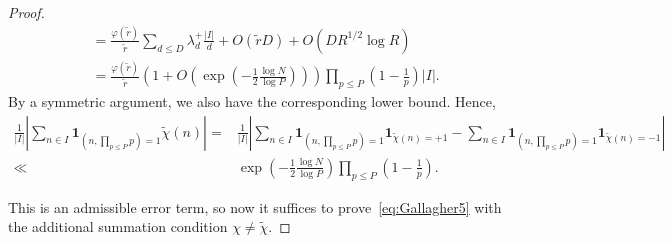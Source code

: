 \documentclass[12pt]{amsart}
\theoremstyle{definition}
\theoremstyle{remark}
\numberwithin{equation}{section}
\newcommand{\1}{\mathbf{1}}
\begin{document}
\begin{proof}
\begin{align*}
        &=\frac{\varphi(\widetilde{r})}{\widetilde{r}}\sum_{d\leq D}\lambda_d^{+}\frac{|I|}{d}+O(\widetilde{r}D)+O(D R^{1/2}\log R)\\
        &=\frac{\varphi(\widetilde{r})}{\widetilde{r}}\left(1+O\left(\exp\left(-\frac{1}{2}\frac{\log N}{\log P}\right)\right)\right)\prod_{p\leq P}\left(1-\frac{1}{p}\right)|I|.
    \end{align*}
    By a symmetric  argument, we also have the corresponding lower bound. Hence,  
    \begin{align*}
        \frac{1}{|I|}\left|\sum_{n\in I}\1_{(n,\prod_{p\leq P}p)=1}\widetilde{\chi}(n)\right|=& \frac{1}{|I|}\left|\sum_{n\in I}\1_{(n,\prod_{p\leq P}p)=1}\1_{\widetilde{\chi}(n)=+1}-\sum_{n\in I}\1_{(n,\prod_{p\leq P}p)=1}\1_{\widetilde{\chi}(n)=-1}\right|\\
        \ll &\exp\left(-\frac{1}{2}\frac{\log N}{\log P}\right)\prod_{p\leq P}\left(1-\frac{1}{p}\right).  
    \end{align*}

    
    
    This is an admissible error term, so now it suffices to prove~\eqref{eq:Gallagher5} with the additional summation condition $\chi\neq \widetilde{\chi}$. 


\end{proof}
\end{document}
